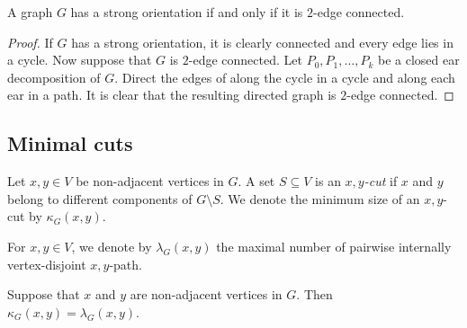 \begin{izrek}[Robbin]
A graph $G$ has a strong orientation if and only if it is $2$-edge
connected.
\end{izrek}

\begin{proof}
If $G$ has a strong orientation, it is clearly connected and every
edge lies in a cycle. Now suppose that $G$ is $2$-edge connected.
Let $P_0, P_1, \dots, P_k$ be a closed ear decomposition of $G$.
Direct the edges of along the cycle in a cycle and along each ear
in a path. It is clear that the resulting directed graph is
$2$-edge connected.
\end{proof}

\newpage

\subsection{Minimal cuts}

\begin{definicija}
Let $x, y \in V$ be non-adjacent vertices in $G$. A set
$S \subseteq V$ is an \emph{$x,y$-cut} if $x$ and
$y$ belong to different components of $G \setminus S$. We denote
the minimum size of an $x,y$-cut by $\kappa_G(x,y)$.
\end{definicija}

\begin{definicija}
For $x, y \in V$, we denote by $\lambda_G(x,y)$ the maximal number
of pairwise internally vertex-disjoint $x,y$-path.
\end{definicija}

\begin{izrek}[Menger]
Suppose that $x$ and $y$ are non-adjacent vertices in $G$. Then
$\kappa_G(x,y) = \lambda_G(x,y)$.
\end{izrek}

